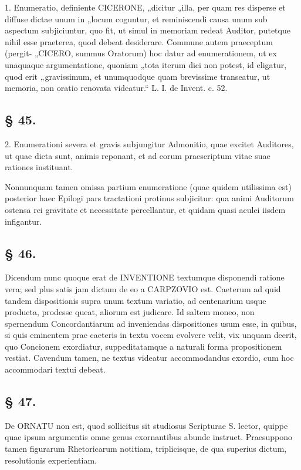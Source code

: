 1. Enumeratio, definiente CICERONE, „dicitur „illa, per quam res disperse et diffuse dictae unum in „locum coguntur, et reminiscendi causa unum sub aspectum subjiciuntur, quo fit, ut simul in memoriam redeat Auditor, putetque nihil esse praeterea, quod debeat desiderare. Commune autem praeceptum (pergit- „CICERO, summus Oratorum) hoc datur ad enumerationem, ut ex unaquaque argumentatione, quoniam „tota iterum dici non potest, id eligatur, quod erit „gravissimum, et unumquodque quam brevissime transeatur, ut memoria, non oratio renovata videatur.“ L. I. de Invent. c. 52.

\subsection*{§ 45.}

2. Enumerationi severa et gravis subjungitur Admonitio, quae excitet Auditores, ut quae dicta sunt, animis reponant, et ad eorum praescriptum vitae suae rationes instituant.

Nonnunquam tamen omissa partium enumeratione (quae quidem utilissima est) posterior haec Epilogi pars tractationi protinus subjicitur: qua animi Auditorum ostensa rei gravitate et necessitate percellantur, et quidam quasi aculei iisdem infigantur.

\subsection*{§ 46.}

Dicendum nunc quoque erat de INVENTIONE textumque disponendi ratione vera; sed plus satis jam dictum de eo a CARPZOVIO est. Caeterum ad quid tandem dispositionis supra unum textum variatio, ad centenarium usque producta, prodesse queat, aliorum est judicare. Id saltem moneo, non spernendum Concordantiarum ad inveniendas dispositiones usum esse, in quibus, si quis eminentem prae caeteris in textu vocem evolvere velit, vix unquam deerit, quo Concionem exordiatur, suppeditatamque a naturali forma propositionem vestiat. Cavendum tamen, ne textus videatur accommodandus exordio, cum hoc accommodari textui debeat.

\subsection*{§ 47.}

De ORNATU non est, quod sollicitus sit studiosus Scripturae S. lector, quippe quae ipsum argumentis omne genus exornantibus abunde instruet. Praesuppono tamen figurarum Rhetoricarum notitiam, triplicisque, de qua superius dictum, resolutionis experientiam.

